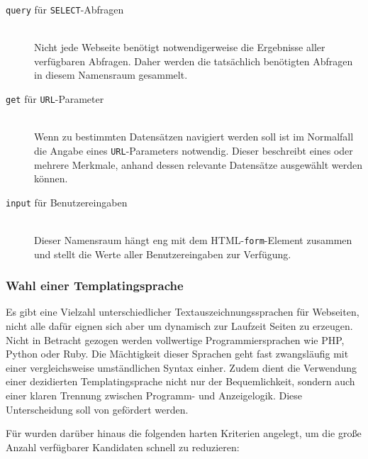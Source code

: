 \begin{description}
\item[\texttt{query} für \texttt{SELECT}-Abfragen] \hfill \\
  Nicht jede Webseite benötigt notwendigerweise die Ergebnisse aller verfügbaren Abfragen. Daher werden die tatsächlich benötigten Abfragen in diesem Namensraum gesammelt.
\item[\texttt{get} für \texttt{URL}-Parameter] \hfill \\
  Wenn zu bestimmten Datensätzen navigiert werden soll ist im Normalfall die Angabe eines \texttt{URL}-Parameters notwendig. Dieser beschreibt eines oder mehrere Merkmale, anhand dessen relevante Datensätze ausgewählt werden können.
\item[\texttt{input} für Benutzereingaben] \hfill \\
  Dieser Namensraum hängt eng mit dem HTML-\texttt{form}-Element zusammen und stellt die Werte aller Benutzereingaben zur Verfügung.
\end{description}

\subsubsection{Wahl einer Templatingsprache}

Es gibt eine Vielzahl unterschiedlicher Textauszeichnungssprachen für Webseiten, nicht alle dafür eignen sich aber um dynamisch zur Laufzeit Seiten zu erzeugen. Nicht in Betracht gezogen werden vollwertige Programmiersprachen wie PHP, Python oder Ruby. Die Mächtigkeit dieser Sprachen geht fast zwangsläufig mit einer vergleichsweise umständlichen Syntax einher. Zudem dient die Verwendung einer dezidierten Templatingsprache nicht nur der Bequemlichkeit, sondern auch einer klaren Trennung zwischen Programm- und Anzeigelogik. Diese Unterscheidung soll von \idename gefördert werden.

Für \idename wurden darüber hinaus die folgenden harten Kriterien angelegt, um die große Anzahl verfügbarer Kandidaten schnell zu reduzieren:

